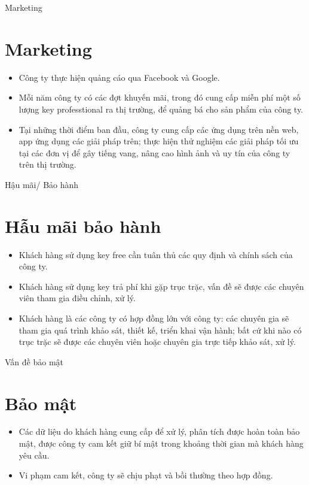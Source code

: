 \documentclass{beamer}
\begin{document}
\begin{frame}{Marketing}
\section{Marketing}
\begin{itemize}
\item Công ty thực hiện quảng cáo qua Facebook và Google.

\item Mỗi năm công ty có các đợt khuyến mãi, trong đó cung cấp miễn phí một số lượng key professtional ra thị trường, để quảng bá cho sản phẩm của công ty.

\item Tại những thời điểm ban đầu, công ty cung cấp các ứng dụng trên nền web, app ứng dụng các giải pháp trên; thực hiện thử nghiệm các giải pháp tối ưu tại các đơn vị để gây tiếng vang, nâng cao hình ảnh và uy tín của công ty trên thị trường.


\end{itemize}

\end{frame}
\begin{frame}{Hậu mãi/ Bảo hành}
\section{Hẫu mãi bảo hành}
\begin{itemize}
\item Khách hàng sử dụng key free cần tuân thủ các quy định và chính sách của công ty.

\item Khách hàng sử dụng key trả phí khi gặp trục trặc, vấn đề sẽ được các chuyên viên tham gia điều chỉnh, xử lý.

\item Khách hàng là các công ty có hợp đồng lớn với công ty: các chuyên gia sẽ tham gia quá trình khảo sát, thiết kế, triển khai vận hành; bất cứ khi nào có trục trặc sẽ được các chuyên viên hoặc chuyên gia trực tiếp khảo sát, xử lý.

\end{itemize}
\end{frame}
\begin{frame}{Vấn đề bảo mật}
\section{Bảo mật}
\begin{itemize}
\item Các dữ liệu do khách hàng cung cấp để xử lý, phân tích được hoàn toàn bảo mật, được công ty cam kết giữ bí mật trong khoảng thời gian mà khách hàng yêu cầu.
\item Vi phạm cam kết, công ty sẽ chịu phạt và bồi thường theo hợp đồng.

\end{itemize}
\end{frame}
\end{document}
